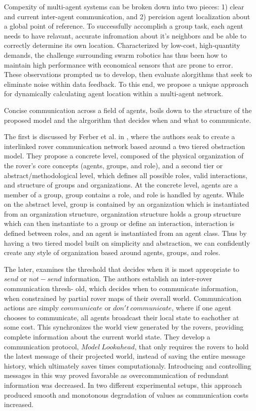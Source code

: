 Compexity of multi-agent systems can be broken down into two pieces: 1) clear and current inter-agent communication, and 2) percision agent localization about a global point of reference. To successfully accomplish a group task, each agent needs to have relavant, accurate infromation about it's neighbors and be able to correctly determine its own location. Characterized by low-cost, high-quantity demands, the challenge surrounding swarm robotics has thus been how to maintain high performance with economical sensors that are prone to error. These observations prompted us to develop, then evaluate alorgithms that seek to eliminate noise within data feedback. To this end, we propose a unique approach for dynamically calculating agent location within a multi-agent network.

Concise communication across a field of agents, boils down to the structure of the proposed model and the alrgorithm that decides when and what to communicate. 

The first is discussed by Ferber et al. in \cite{ferber1998meta}, where the authors seak to create a interlinked rover communication network based around a two tiered obstraction model. They propose a concrete level, composed of the physical organization of the rover’s core concepts (agents, groups, and role), and a second tier or abstract/methodological level, which defines all possible roles, valid interactions, and structure of groups and organizations. At the concrete level, agents are a member of a group, group contains a role, and role is handled by agents. While on the abstract level, group is contained by an organization which is instantiated from an organization structure, organization structure holds a group structure which can then instantiate to a group or define an interaction, interaction is defined between roles, and an agent is instantiated from an agent class. Thus by having a two tiered model built on simplicity and abstraction, we can confidently create any style of organization based around agents, groups, and roles.

The later, examines the threshold that decides when it is most appropriate to $send$ or $not-send$ information. The authors \cite{becker2009analyzing} establish an inter-rover communication thresh- old, which decides when to communicate information, when constrained by partial rover maps of their overall world. Communication actions are simply $communicate$ or $don′t~communicate$, where if one agent chooses to communicate, all agents broadcast their local state to eachother at some cost. This synchronizes the world view generated by the rovers, providing complete information about the current world state. They develop a communication protocol, $Model~Lookahead$, that only requires the rovers to hold the latest message of their projected world, instead of saving the entire message history, which ultimately saves times computationaly. Introducing and controlling messages in this way proved favorable as overcommunication of redundant information was decreased. In two different experimental setups, this approach produced smooth and monotonous degradation of values as communication costs increased.


